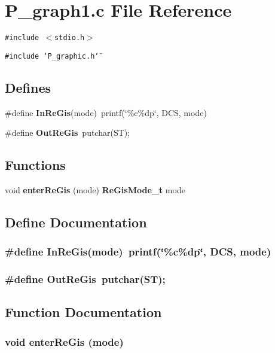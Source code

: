 \section{P\_\-graph1.c File Reference}
\label{P__graph1_8c}
{\tt \#include $<$stdio.h$>$}\par
{\tt \#include \char`\"{}P\_\-graphic.h\char`\"{}}\par
\subsection*{Defines}
\begin{CompactItemize}
\item 
\#define {\bf In\-Re\-Gis}(mode)\ printf(\char`\"{}\%c\%dp\char`\"{}, DCS, mode)
\item 
\#define {\bf Out\-Re\-Gis}\ putchar(ST);
\end{CompactItemize}
\subsection*{Functions}
\begin{CompactItemize}
\item 
void {\bf enter\-Re\-Gis} (mode) {\bf Re\-Gis\-Mode\_\-t} mode
\end{CompactItemize}


\subsection{Define Documentation}
\subsubsection{\setlength{\rightskip}{0pt plus 5cm}\#define In\-Re\-Gis(mode)\ printf(\char`\"{}\%c\%dp\char`\"{}, DCS, mode)}\label{P__graph1_8c_a0}


\subsubsection{\setlength{\rightskip}{0pt plus 5cm}\#define Out\-Re\-Gis\ putchar(ST);}\label{P__graph1_8c_a1}




\subsection{Function Documentation}
\subsubsection{\setlength{\rightskip}{0pt plus 5cm}void enter\-Re\-Gis (mode)}\label{P__graph1_8c_a2}


